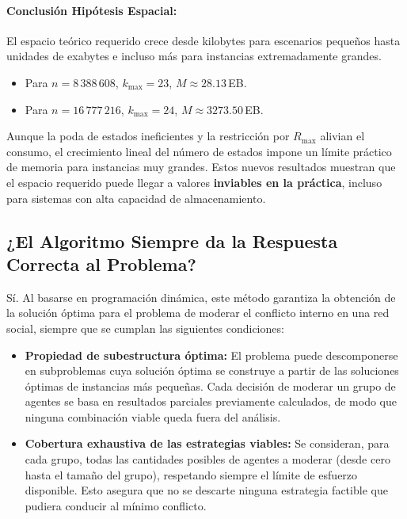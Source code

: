 \documentclass[11pt,letter]{article}
\begin{document}
\begin{itemize}
    \paragraph{Conclusión Hipótesis Espacial:}
    El espacio teórico requerido crece desde kilobytes para escenarios pequeños hasta unidades de exabytes e incluso más para instancias extremadamente grandes.

    \begin{itemize}
      \item Para \(n=8\,388\,608\), \(k_{\max}=23\), \(M\approx28.13\)\,EB.
      \item Para \(n=16\,777\,216\), \(k_{\max}=24\), \(M\approx3273.50\)\,EB.
    \end{itemize}

    Aunque la poda de estados ineficientes y la restricción por \(R_{\max}\) alivian el consumo, el crecimiento lineal del número de estados impone un límite práctico de memoria para instancias muy grandes. Estos nuevos resultados muestran que el espacio requerido puede llegar a valores \textbf{inviables en la práctica}, incluso para sistemas con alta capacidad de almacenamiento.

    \subsection{¿El Algoritmo Siempre da la Respuesta Correcta al Problema?}

    Sí. Al basarse en programación dinámica, este método garantiza la obtención de la solución óptima para el problema de moderar el conflicto interno en una red social, siempre que se cumplan las siguientes condiciones:

    \begin{itemize}

      \item \textbf{Propiedad de subestructura óptima:}
      El problema puede descomponerse en subproblemas cuya solución óptima se construye a partir de las soluciones óptimas de instancias más pequeñas. Cada decisión de moderar un grupo de agentes se basa en resultados parciales previamente calculados, de modo que ninguna combinación viable queda fuera del análisis.

      \item \textbf{Cobertura exhaustiva de las estrategias viables:}
      Se consideran, para cada grupo, todas las cantidades posibles de agentes a moderar (desde cero hasta el tamaño del grupo), respetando siempre el límite de esfuerzo disponible. Esto asegura que no se descarte ninguna estrategia factible que pudiera conducir al mínimo conflicto.


\end{itemize}
\end{itemize}
\end{document}
